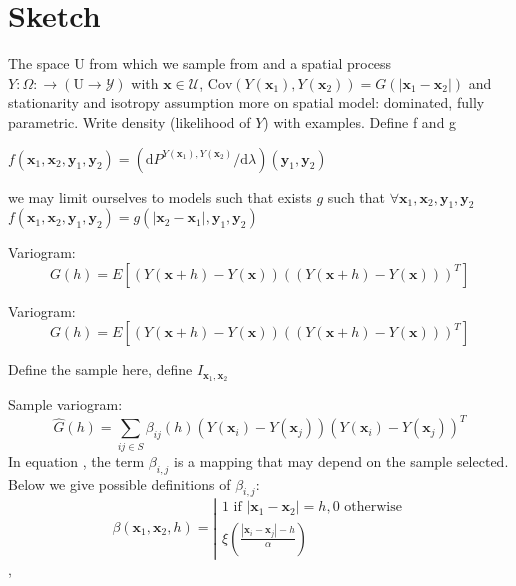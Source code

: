 \documentclass[12pt]{article}
\theoremstyle{definition}
\theoremstyle{remark}
\newcommand{\range}[1]{\mathscr{#1}}
\newcommand{\dominantY}{\lambda}
\newcommand{\paramnuisance}{\xi}
\newcommand{\Cov}{\mathrm{Cov}}
\newcommand{\Semivariogram}{G}
\newcommand{\Sample}{S}
\newcommand{\Pop}{\mathrm{U}}
\newcommand{\position}{\mathbf{x}}
\newcommand{\Signal}{Y}
\newcommand{\signal}{\mathbf{y}}
\begin{document}
\section{Sketch}
The space $\Pop$ from which we sample from and a spatial process $Y:\Omega:\to \left(\Pop\to\range{Y}\right)$ with $\position\in\range{U}$, $\Cov\left(\Signal(\position_{1}), \Signal(\position_{2})\right)=\Semivariogram\left(\left|\position_{1}-\position_{2}\right|\right)$ and stationarity and isotropy assumption {\color{red}more on spatial model: dominated, fully parametric. Write density (likelihood of $Y$) with examples. Define f and g}

 $f(\position_1,\position_2,\signal_1,\signal_2)=\left(\mathrm{d}P^{\Signal(\position_1),\Signal(\position_2)}/\mathrm{d}\dominantY\right)(\signal_1,\signal_2)$
    
    we may limit ourselves to models such that exists $g$ such that 
    $\forall \position_1,\position_2,\signal_1,\signal_2$    $f(\position_1,\position_2,\signal_1,\signal_2)=g(\left|\position_2-\position_1\right|,\signal_1,\signal_2)$
    
Variogram:
\begin{equation}
    G(h)=E[(\Signal(\position+h)-\Signal(\position))((\Signal(\position+h)-\Signal(\position)))^{T}]
\end{equation}


Variogram:
\begin{equation}
    G(h)=E[(Y(\mathbf{x}+h)-Y(\mathbf{x}))((Y(\mathbf{x}+h)-Y(\mathbf{x})))^{T}]
\end{equation}

{\color{red}Define the sample here, define $I_{\position_1,\position_2}$}

Sample variogram:
\begin{equation} \label{somelabel}
    \hat{G}(h)=\sum_{ij\in\Sample}{\beta_{ij}(h)(Y(\mathbf{x}_{i})-Y(\mathbf{x}_{j}))(Y(\mathbf{x}_{i})-Y(\mathbf{x}_{j}))^{T}}
\end{equation}
In equation , the term $\beta_{i,j}$ is a mapping that may depend on the sample selected.
Below we give possible definitions of $\beta_{i,j}$:
\begin{equation}
    \beta(\position_1,\position_2,h)=
    \left|\begin{array}{l}
    1 \text{ if } |\mathbf{x}_1-\mathbf{x}_2|=h, 0 \text{ otherwise}\\
    \paramnuisance(\frac{|\mathbf{x}_{i}-\mathbf{x}_{j}|-h}{\alpha})
    \end{array}\right.
\end{equation},
\end{document}
